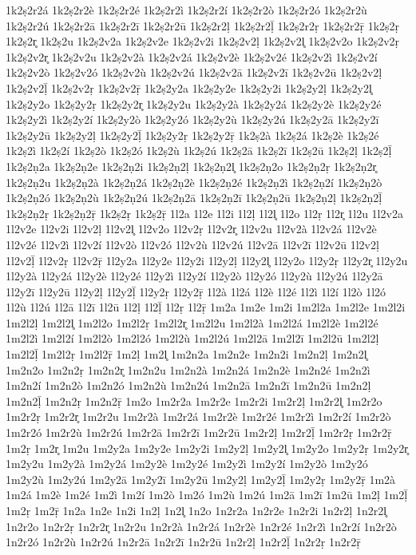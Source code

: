 {1k2ṣ2r2á
1k2ṣ2r2è
1k2ṣ2r2é
1k2ṣ2r2ì
1k2ṣ2r2í
1k2ṣ2r2ò
1k2ṣ2r2ó
1k2ṣ2r2ù
1k2ṣ2r2ú
1k2ṣ2r2ā
1k2ṣ2r2ī
1k2ṣ2r2ū
1k2ṣ2r2ḷ
1k2ṣ2r2ḹ
1k2ṣ2r2ṛ
1k2ṣ2r2ṝ
1k2ṣ2ṛ
1k2ṣ2r̥
1k2ṣ2u
1k2ṣ2v2a
1k2ṣ2v2e
1k2ṣ2v2i
1k2ṣ2v2ḷ
1k2ṣ2v2l̥
1k2ṣ2v2o
1k2ṣ2v2ṛ
1k2ṣ2v2r̥
1k2ṣ2v2u
1k2ṣ2v2à
1k2ṣ2v2á
1k2ṣ2v2è
1k2ṣ2v2é
1k2ṣ2v2ì
1k2ṣ2v2í
1k2ṣ2v2ò
1k2ṣ2v2ó
1k2ṣ2v2ù
1k2ṣ2v2ú
1k2ṣ2v2ā
1k2ṣ2v2ī
1k2ṣ2v2ū
1k2ṣ2v2ḷ
1k2ṣ2v2ḹ
1k2ṣ2v2ṛ
1k2ṣ2v2ṝ
1k2ṣ2y2a
1k2ṣ2y2e
1k2ṣ2y2i
1k2ṣ2y2ḷ
1k2ṣ2y2l̥
1k2ṣ2y2o
1k2ṣ2y2ṛ
1k2ṣ2y2r̥
1k2ṣ2y2u
1k2ṣ2y2à
1k2ṣ2y2á
1k2ṣ2y2è
1k2ṣ2y2é
1k2ṣ2y2ì
1k2ṣ2y2í
1k2ṣ2y2ò
1k2ṣ2y2ó
1k2ṣ2y2ù
1k2ṣ2y2ú
1k2ṣ2y2ā
1k2ṣ2y2ī
1k2ṣ2y2ū
1k2ṣ2y2ḷ
1k2ṣ2y2ḹ
1k2ṣ2y2ṛ
1k2ṣ2y2ṝ
1k2ṣ2à
1k2ṣ2á
1k2ṣ2è
1k2ṣ2é
1k2ṣ2ì
1k2ṣ2í
1k2ṣ2ò
1k2ṣ2ó
1k2ṣ2ù
1k2ṣ2ú
1k2ṣ2ā
1k2ṣ2ī
1k2ṣ2ū
1k2ṣ2ḷ
1k2ṣ2ḹ
1k2ṣ2ṇ2a
1k2ṣ2ṇ2e
1k2ṣ2ṇ2i
1k2ṣ2ṇ2ḷ
1k2ṣ2ṇ2l̥
1k2ṣ2ṇ2o
1k2ṣ2ṇ2ṛ
1k2ṣ2ṇ2r̥
1k2ṣ2ṇ2u
1k2ṣ2ṇ2à
1k2ṣ2ṇ2á
1k2ṣ2ṇ2è
1k2ṣ2ṇ2é
1k2ṣ2ṇ2ì
1k2ṣ2ṇ2í
1k2ṣ2ṇ2ò
1k2ṣ2ṇ2ó
1k2ṣ2ṇ2ù
1k2ṣ2ṇ2ú
1k2ṣ2ṇ2ā
1k2ṣ2ṇ2ī
1k2ṣ2ṇ2ū
1k2ṣ2ṇ2ḷ
1k2ṣ2ṇ2ḹ
1k2ṣ2ṇ2ṛ
1k2ṣ2ṇ2ṝ
1k2ṣ2ṛ
1k2ṣ2ṝ
1l2a
1l2e
1l2i
1l2ḷ
1l2l̥
1l2o
1l2ṛ
1l2r̥
1l2u
1l2v2a
1l2v2e
1l2v2i
1l2v2ḷ
1l2v2l̥
1l2v2o
1l2v2ṛ
1l2v2r̥
1l2v2u
1l2v2à
1l2v2á
1l2v2è
1l2v2é
1l2v2ì
1l2v2í
1l2v2ò
1l2v2ó
1l2v2ù
1l2v2ú
1l2v2ā
1l2v2ī
1l2v2ū
1l2v2ḷ
1l2v2ḹ
1l2v2ṛ
1l2v2ṝ
1l2y2a
1l2y2e
1l2y2i
1l2y2ḷ
1l2y2l̥
1l2y2o
1l2y2ṛ
1l2y2r̥
1l2y2u
1l2y2à
1l2y2á
1l2y2è
1l2y2é
1l2y2ì
1l2y2í
1l2y2ò
1l2y2ó
1l2y2ù
1l2y2ú
1l2y2ā
1l2y2ī
1l2y2ū
1l2y2ḷ
1l2y2ḹ
1l2y2ṛ
1l2y2ṝ
1l2à
1l2á
1l2è
1l2é
1l2ì
1l2í
1l2ò
1l2ó
1l2ù
1l2ú
1l2ā
1l2ī
1l2ū
1l2ḷ
1l2ḹ
1l2ṛ
1l2ṝ
1m2a
1m2e
1m2i
1m2l2a
1m2l2e
1m2l2i
1m2l2ḷ
1m2l2l̥
1m2l2o
1m2l2ṛ
1m2l2r̥
1m2l2u
1m2l2à
1m2l2á
1m2l2è
1m2l2é
1m2l2ì
1m2l2í
1m2l2ò
1m2l2ó
1m2l2ù
1m2l2ú
1m2l2ā
1m2l2ī
1m2l2ū
1m2l2ḷ
1m2l2ḹ
1m2l2ṛ
1m2l2ṝ
1m2ḷ
1m2l̥
1m2n2a
1m2n2e
1m2n2i
1m2n2ḷ
1m2n2l̥
1m2n2o
1m2n2ṛ
1m2n2r̥
1m2n2u
1m2n2à
1m2n2á
1m2n2è
1m2n2é
1m2n2ì
1m2n2í
1m2n2ò
1m2n2ó
1m2n2ù
1m2n2ú
1m2n2ā
1m2n2ī
1m2n2ū
1m2n2ḷ
1m2n2ḹ
1m2n2ṛ
1m2n2ṝ
1m2o
1m2r2a
1m2r2e
1m2r2i
1m2r2ḷ
1m2r2l̥
1m2r2o
1m2r2ṛ
1m2r2r̥
1m2r2u
1m2r2à
1m2r2á
1m2r2è
1m2r2é
1m2r2ì
1m2r2í
1m2r2ò
1m2r2ó
1m2r2ù
1m2r2ú
1m2r2ā
1m2r2ī
1m2r2ū
1m2r2ḷ
1m2r2ḹ
1m2r2ṛ
1m2r2ṝ
1m2ṛ
1m2r̥
1m2u
1m2y2a
1m2y2e
1m2y2i
1m2y2ḷ
1m2y2l̥
1m2y2o
1m2y2ṛ
1m2y2r̥
1m2y2u
1m2y2à
1m2y2á
1m2y2è
1m2y2é
1m2y2ì
1m2y2í
1m2y2ò
1m2y2ó
1m2y2ù
1m2y2ú
1m2y2ā
1m2y2ī
1m2y2ū
1m2y2ḷ
1m2y2ḹ
1m2y2ṛ
1m2y2ṝ
1m2à
1m2á
1m2è
1m2é
1m2ì
1m2í
1m2ò
1m2ó
1m2ù
1m2ú
1m2ā
1m2ī
1m2ū
1m2ḷ
1m2ḹ
1m2ṛ
1m2ṝ
1n2a
1n2e
1n2i
1n2ḷ
1n2l̥
1n2o
1n2r2a
1n2r2e
1n2r2i
1n2r2ḷ
1n2r2l̥
1n2r2o
1n2r2ṛ
1n2r2r̥
1n2r2u
1n2r2à
1n2r2á
1n2r2è
1n2r2é
1n2r2ì
1n2r2í
1n2r2ò
1n2r2ó
1n2r2ù
1n2r2ú
1n2r2ā
1n2r2ī
1n2r2ū
1n2r2ḷ
1n2r2ḹ
1n2r2ṛ
1n2r2ṝ
}
